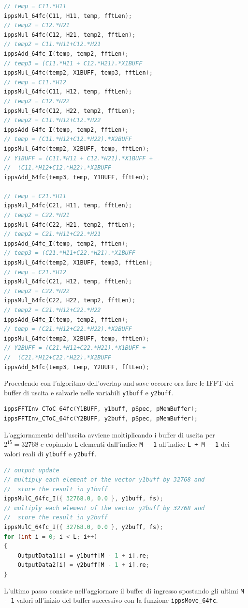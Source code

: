 \documentclass[12pt,a4paper,titlepage]{article}
\begin{document}
\begin{lstlisting}[language=cpp, label=code:buffer_output_frequenza, caption = Calcolo dei buffer di uscita in frequenza, breaklines = false, captionpos = b]
// temp = C11.*H11
ippsMul_64fc(C11, H11, temp, fftLen);
// temp2 = C12.*H21
ippsMul_64fc(C12, H21, temp2, fftLen);
// temp2 = C11.*H11+C12.*H21
ippsAdd_64fc_I(temp, temp2, fftLen);
// temp3 = (C11.*H11 + C12.*H21).*X1BUFF
ippsMul_64fc(temp2, X1BUFF, temp3, fftLen);
// temp = C11.*H12
ippsMul_64fc(C11, H12, temp, fftLen);
// temp2 = C12.*H22
ippsMul_64fc(C12, H22, temp2, fftLen);
// temp2 = C11.*H12+C12.*H22
ippsAdd_64fc_I(temp, temp2, fftLen);
// temp = (C11.*H12+C12.*H22).*X2BUFF
ippsMul_64fc(temp2, X2BUFF, temp, fftLen);
// Y1BUFF = (C11.*H11 + C12.*H21).*X1BUFF +
//	(C11.*H12+C12.*H22).*X2BUFF
ippsAdd_64fc(temp3, temp, Y1BUFF, fftLen);

// temp = C21.*H11
ippsMul_64fc(C21, H11, temp, fftLen);
// temp2 = C22.*H21
ippsMul_64fc(C22, H21, temp2, fftLen);
// temp2 = C21.*H11+C22.*H21
ippsAdd_64fc_I(temp, temp2, fftLen);
// temp3 = (C21.*H11+C22.*H21).*X1BUFF
ippsMul_64fc(temp2, X1BUFF, temp3, fftLen);
// temp = C21.*H12
ippsMul_64fc(C21, H12, temp, fftLen);
// temp2 = C22.*H22
ippsMul_64fc(C22, H22, temp2, fftLen);
// temp2 = C21.*H12+C22.*H22
ippsAdd_64fc_I(temp, temp2, fftLen);
// temp = (C21.*H12+C22.*H22).*X2BUFF
ippsMul_64fc(temp2, X2BUFF, temp, fftLen);
// Y2BUFF = (C21.*H11+C22.*H21).*X1BUFF +
//	(C21.*H12+C22.*H22).*X2BUFF
ippsAdd_64fc(temp3, temp, Y2BUFF, fftLen);
\end{lstlisting}
Procedendo con l'algoritmo dell'overlap and save occorre ora fare le IFFT dei buffer di uscita e salvarle nelle variabili \texttt{y1buff} e \texttt{y2buff}. 

\begin{lstlisting}[language=cpp, label=code:buffer_output_tempo, caption = Calcolo dei buffer di uscita nel tempo con la IFFT, breaklines = false, captionpos = b]
ippsFFTInv_CToC_64fc(Y1BUFF, y1buff, pSpec, pMemBuffer);
ippsFFTInv_CToC_64fc(Y2BUFF, y2buff, pSpec, pMemBuffer);
\end{lstlisting}
L'aggiornamento dell'uscita avviene moltiplicando i buffer di uscita per $2^{15} = 32768$ e copiando \texttt{L} elementi dall'indice \texttt{M - 1} all'indice \texttt{L + M - 1} dei valori reali di \texttt{y1buff} e \texttt{y2buff}.

\begin{lstlisting}[language=cpp, label=code:aggiornamento_uscite, caption = Aggiornamento delle uscite, breaklines = false, captionpos = b]
// output update
// multiply each element of the vector y1buff by 32768 and 
//	store the result in y1buff
ippsMulC_64fc_I({ 32768.0, 0.0 }, y1buff, fs);
// multiply each element of the vector y2buff by 32768 and 
//	store the result in y2buff
ippsMulC_64fc_I({ 32768.0, 0.0 }, y2buff, fs);
for (int i = 0; i < L; i++)
{
	OutputData1[i] = y1buff[M - 1 + i].re;
	OutputData2[i] = y2buff[M - 1 + i].re;
}
\end{lstlisting}
L'ultimo passo consiste nell'aggiornare il buffer di ingresso spostando gli ultimi \texttt{M - 1} valori all'inizio del buffer successivo con la funzione \texttt{ippsMove\_64fc}.
\end{document}
